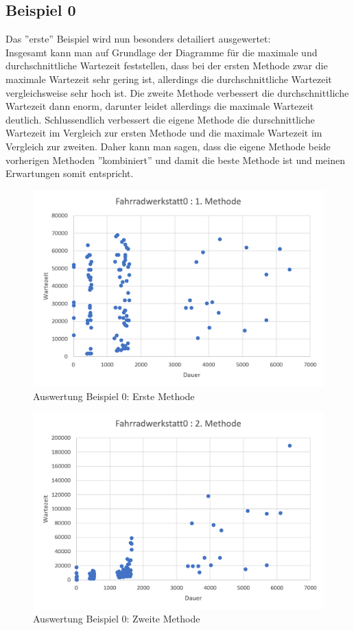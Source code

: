 \documentclass[a4paper,10pt,ngerman]{scrartcl}
\begin{document}
    \subsection{Beispiel 0\label{sec:Beispiele:0}}
      Das ''erste'' Beispiel wird nun besonders detailiert ausgewertet:\\
      Insgesamt kann man auf Grundlage der Diagramme für die maximale und durchschnittliche Wartezeit feststellen, dass bei der ersten Methode zwar die maximale Wartezeit sehr gering ist, allerdings die durchschnittliche Wartezeit vergleichsweise sehr hoch ist. Die zweite Methode verbessert die durchschnittliche Wartezeit dann enorm, darunter leidet allerdings die maximale Wartezeit deutlich. Schlussendlich verbessert die eigene Methode die durschnittliche Wartezeit im Vergleich zur ersten Methode und die maximale Wartezeit im Vergleich zur zweiten. Daher kann man sagen, dass die eigene Methode beide vorherigen Methoden ''kombiniert'' und damit die beste Methode ist und meinen Erwartungen somit entspricht.
      \begin{figure}[H]
        \centering
        \includegraphics[width=15cm]{../beispielausgaben/fahrradwerkstatt0_sta1.png}
        \caption{Auswertung Beispiel 0: Erste Methode}
        \label{fig:Auswertung01}
      \end{figure}
      \begin{figure}[H]
        \centering
        \includegraphics[width=15cm]{../beispielausgaben/fahrradwerkstatt0_sta2.png}
        \caption{Auswertung Beispiel 0: Zweite Methode}
        \label{fig:Auswertung02}
      \end{figure}
\end{document}
